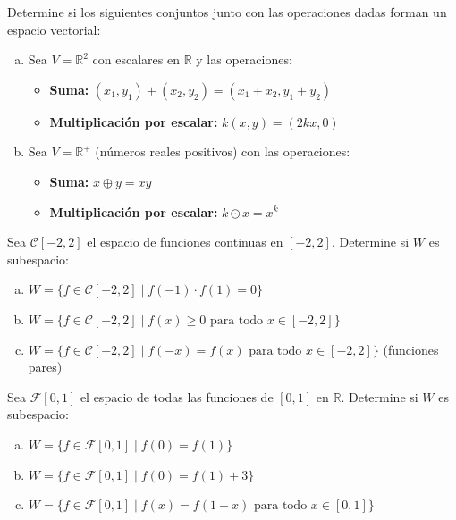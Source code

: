\begin{prob} Determine si los siguientes conjuntos junto con las operaciones dadas forman un espacio vectorial:

\begin{enumerate}[(a)]
\item Sea $V = \mathbb{R}^2$ con escalares en $\mathbb{R}$ y las operaciones:
\begin{itemize}
\item \textbf{Suma:} $(x_1,y_1) + (x_2,y_2) = (x_1+x_2, y_1+y_2)$
\item \textbf{Multiplicación por escalar:} $k(x,y) = (2kx, 0)$
\end{itemize}

\item Sea $V = \mathbb{R}^+$ (números reales positivos) con las operaciones:
\begin{itemize}
\item \textbf{Suma:} $x \oplus y = xy$
\item \textbf{Multiplicación por escalar:} $k \odot x = x^k$
\end{itemize}
\end{enumerate}
\end{prob}

\begin{prob} Sea $\mathcal{C}[-2,2]$ el espacio de funciones continuas en $[-2,2]$. Determine si $W$ es subespacio:
\begin{enumerate}[(a)]
\item $W = \{f \in \mathcal{C}[-2,2] \mid f(-1) \cdot f(1) = 0\}$
\item $W = \{f \in \mathcal{C}[-2,2] \mid f(x) \geq 0 \text{ para todo } x \in [-2,2]\}$
\item $W = \{f \in \mathcal{C}[-2,2] \mid f(-x) = f(x) \text{ para todo } x \in [-2,2]\}$ (funciones pares)
\end{enumerate}
\end{prob}

\begin{prob} Sea $\mathcal{F}[0,1]$ el espacio de todas las funciones de $[0,1]$ en $\mathbb{R}$. Determine si $W$ es subespacio:
\begin{enumerate}[(a)]
\item $W = \{f \in \mathcal{F}[0,1] \mid f(0) = f(1)\}$
\item $W = \{f \in \mathcal{F}[0,1] \mid f(0) = f(1) + 3\}$
\item $W = \{f \in \mathcal{F}[0,1] \mid f(x) = f(1-x) \text{ para todo } x \in [0,1]\}$
\end{enumerate}
\end{prob}

